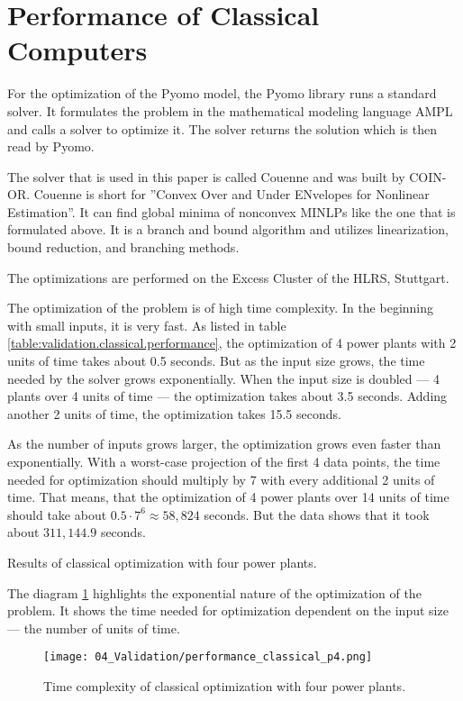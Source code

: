 \section{Performance of Classical Computers}

For the optimization of the Pyomo model, the Pyomo library runs a standard solver.
It formulates the problem in the mathematical modeling language AMPL
and calls a solver to optimize it.
The solver returns the solution which is then read by Pyomo.
\cite{PyomoAMPL}

The solver that is used in this paper is called Couenne and was built by COIN-OR.
Couenne is short for ''Convex Over and Under ENvelopes for Nonlinear Estimation''.
It can find global minima of nonconvex MINLPs like the one that is formulated above.
It is a branch and bound algorithm and utilizes linearization, bound reduction, and branching methods.
\cite{CoinorHome,CouenneRepo}

The optimizations are performed on the Excess Cluster of the HLRS, Stuttgart.
\cite{ExcessHLRS,HLRS}

The optimization of the problem is of high time complexity.
In the beginning with small inputs, it is very fast.
As listed in table \ref{table:validation.classical.performance}, the optimization of 4 power plants with 2 units of time takes about 0.5 seconds.
But as the input size grows, the time needed by the solver grows exponentially.
When the input size is doubled --- 4 plants over 4 units of time --- the optimization takes about 3.5 seconds.
Adding another 2 units of time, the optimization takes 15.5 seconds.

As the number of inputs grows larger, the optimization grows even faster than exponentially.
With a worst-case projection of the first 4 data points, the time needed for optimization should multiply by 7 with every additional 2 units of time.
That means, that the optimization of 4 power plants over 14 units of time should take about $0.5 \cdot 7^6 \approx 58,824$ seconds.
But the data shows that it took about $311,144.9$ seconds.

\begin{table}[ht]
  \centering
  
  \caption{Results of classical optimization with four power plants.}
  \label{table:validation.classical.performance}
\end{table}

The diagram \ref{figure:validation.classical.performance} highlights the exponential nature of the optimization of the problem.
It shows the time needed for optimization dependent on the input size --- the number of units of time.

\begin{figure}[ht]
  \centering
  \texttt{[image: 04\_Validation/performance\_classical\_p4.png]}
  \caption{Time complexity of classical optimization with four power plants.}
  \label{figure:validation.classical.performance}
\end{figure}
